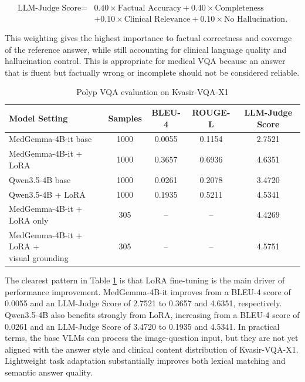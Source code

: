 \[
\begin{aligned}
\text{LLM-Judge Score} ={}& 0.40 \times \text{Factual Accuracy}
+ 0.40 \times \text{Completeness} \\
&+ 0.10 \times \text{Clinical Relevance}
+ 0.10 \times \text{No Hallucination}.
\end{aligned}
\]

This weighting gives the highest importance to factual correctness and coverage of the reference answer, while still accounting for clinical language quality and hallucination control. This is appropriate for medical VQA because an answer that is fluent but factually wrong or incomplete should not be considered reliable.

\begin{table}[H]
\centering
\begin{adjustbox}{width=\textwidth}
\begin{tabular}{p{} c c c c}
\hline\hline
Model Setting & Samples & BLEU-4 & ROUGE-L & LLM-Judge Score \\
\hline
MedGemma-4B-it base & 1000 & 0.0055 & 0.1154 & 2.7521 \\
MedGemma-4B-it + LoRA  & 1000 & 0.3657 & 0.6936 & 4.6351 \\
Qwen3.5-4B base & 1000 & 0.0261 & 0.2078 & 3.4720 \\
Qwen3.5-4B + LoRA  & 1000 & 0.1935 & 0.5211 & 4.5341 \\
MedGemma-4B-it + LoRA only & 305 & -- & -- & 4.4269 \\
\shortstack[l]{MedGemma-4B-it + LoRA +\\visual grounding} & 305 & -- & -- & 4.5751 \\
\hline\hline
\end{tabular}
\end{adjustbox}
\caption{Polyp VQA evaluation on Kvasir-VQA-X1}
\label{table:polyp-vqa-lora-evaluation}
\end{table}

The clearest pattern in Table \ref{table:polyp-vqa-lora-evaluation} is that LoRA fine-tuning is the main driver of performance improvement. MedGemma-4B-it improves from a BLEU-4 score of 0.0055 and an LLM-Judge Score of 2.7521 to 0.3657 and 4.6351, respectively. Qwen3.5-4B also benefits strongly from LoRA, increasing from a BLEU-4 score of 0.0261 and an LLM-Judge Score of 3.4720 to 0.1935 and 4.5341. In practical terms, the base VLMs can process the image-question input, but they are not yet aligned with the answer style and clinical content distribution of Kvasir-VQA-X1. Lightweight task adaptation substantially improves both lexical matching and semantic answer quality.

